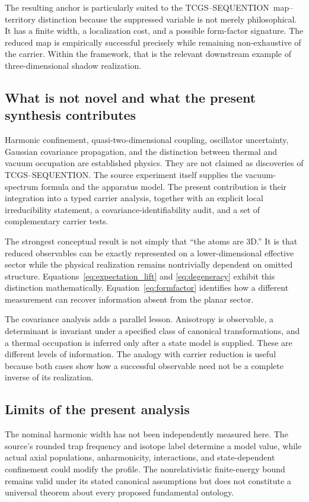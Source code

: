 \documentclass[11pt,a4paper]{article}
\theoremstyle{definition}
\theoremstyle{remark}
\newcommand{\TCGS}{TCGS--SEQUENTION}
\begin{document}
The resulting anchor is particularly suited to the \TCGS\ map--territory distinction because the suppressed variable is not merely philosophical. It has a finite width, a localization cost, and a possible form-factor signature. The reduced map is empirically successful precisely while remaining non-exhaustive of the carrier. Within the framework, that is the relevant downstream example of three-dimensional shadow realization.\cite{foundation}

\subsection{What is not novel and what the present synthesis contributes}
Harmonic confinement, quasi-two-dimensional coupling, oscillator uncertainty, Gaussian covariance propagation, and the distinction between thermal and vacuum occupation are established physics. They are not claimed as discoveries of \TCGS. The source experiment itself supplies the vacuum-spectrum formula and the apparatus model. The present contribution is their integration into a typed carrier analysis, together with an explicit local irreducibility statement, a covariance-identifiability audit, and a set of complementary carrier tests.\cite{zhang2026,hadzibabic,petrov,weedbrook}

The strongest conceptual result is not simply that ``the atoms are 3D.'' It is that reduced observables can be exactly represented on a lower-dimensional effective sector while the physical realization remains nontrivially dependent on omitted structure. Equations~\eqref{eq:expectation_lift} and \eqref{eq:degeneracy} exhibit this distinction mathematically. Equation~\eqref{eq:formfactor} identifies how a different measurement can recover information absent from the planar sector.

The covariance analysis adds a parallel lesson. Anisotropy is observable, a determinant is invariant under a specified class of canonical transformations, and a thermal occupation is inferred only after a state model is supplied. These are different levels of information. The analogy with carrier reduction is useful because both cases show how a successful observable need not be a complete inverse of its realization.

\subsection{Limits of the present analysis}
The nominal harmonic width has not been independently measured here. The source's rounded trap frequency and isotope label determine a model value, while actual axial populations, anharmonicity, interactions, and state-dependent confinement could modify the profile. The nonrelativistic finite-energy bound remains valid under its stated canonical assumptions but does not constitute a universal theorem about every proposed fundamental ontology.
\end{document}
